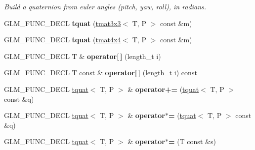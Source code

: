 \begin{DoxyCompactItemize}
\begin{DoxyCompactList}\small\item\em Build a quaternion from euler angles (pitch, yaw, roll), in radians. \end{DoxyCompactList}\item 
G\+L\+M\+\_\+\+F\+U\+N\+C\+\_\+\+D\+E\+CL {\bfseries tquat} (\hyperlink{structglm_1_1detail_1_1tmat3x3}{tmat3x3}$<$ T, P $>$ const \&m)\hypertarget{structglm_1_1detail_1_1tquat_a84d40b0f5ab95f1e5ce01596c909fa25}{}\label{structglm_1_1detail_1_1tquat_a84d40b0f5ab95f1e5ce01596c909fa25}

\item 
G\+L\+M\+\_\+\+F\+U\+N\+C\+\_\+\+D\+E\+CL {\bfseries tquat} (\hyperlink{structglm_1_1detail_1_1tmat4x4}{tmat4x4}$<$ T, P $>$ const \&m)\hypertarget{structglm_1_1detail_1_1tquat_ad880a08dccbc297944a24204640c516d}{}\label{structglm_1_1detail_1_1tquat_ad880a08dccbc297944a24204640c516d}

\item 
G\+L\+M\+\_\+\+F\+U\+N\+C\+\_\+\+D\+E\+CL T \& {\bfseries operator\mbox{[}$\,$\mbox{]}} (length\+\_\+t i)\hypertarget{structglm_1_1detail_1_1tquat_ad4f23768ca2296f8e0f140a5f03cd404}{}\label{structglm_1_1detail_1_1tquat_ad4f23768ca2296f8e0f140a5f03cd404}

\item 
G\+L\+M\+\_\+\+F\+U\+N\+C\+\_\+\+D\+E\+CL T const \& {\bfseries operator\mbox{[}$\,$\mbox{]}} (length\+\_\+t i) const \hypertarget{structglm_1_1detail_1_1tquat_aa5925e3eb8482a6c64881bfa6ca5e259}{}\label{structglm_1_1detail_1_1tquat_aa5925e3eb8482a6c64881bfa6ca5e259}

\item 
G\+L\+M\+\_\+\+F\+U\+N\+C\+\_\+\+D\+E\+CL \hyperlink{structglm_1_1detail_1_1tquat}{tquat}$<$ T, P $>$ \& {\bfseries operator+=} (\hyperlink{structglm_1_1detail_1_1tquat}{tquat}$<$ T, P $>$ const \&q)\hypertarget{structglm_1_1detail_1_1tquat_af711fbfb41fee281c93d990afa15f01e}{}\label{structglm_1_1detail_1_1tquat_af711fbfb41fee281c93d990afa15f01e}

\item 
G\+L\+M\+\_\+\+F\+U\+N\+C\+\_\+\+D\+E\+CL \hyperlink{structglm_1_1detail_1_1tquat}{tquat}$<$ T, P $>$ \& {\bfseries operator$\ast$=} (\hyperlink{structglm_1_1detail_1_1tquat}{tquat}$<$ T, P $>$ const \&q)\hypertarget{structglm_1_1detail_1_1tquat_a243cc89ef80ff3d0a9fd85fc3038587e}{}\label{structglm_1_1detail_1_1tquat_a243cc89ef80ff3d0a9fd85fc3038587e}

\item 
G\+L\+M\+\_\+\+F\+U\+N\+C\+\_\+\+D\+E\+CL \hyperlink{structglm_1_1detail_1_1tquat}{tquat}$<$ T, P $>$ \& {\bfseries operator$\ast$=} (T const \&s)\hypertarget{structglm_1_1detail_1_1tquat_a65a23d874bc35ecade85c50bf5425a90}{}\label{structglm_1_1detail_1_1tquat_a65a23d874bc35ecade85c50bf5425a90}


\end{DoxyCompactItemize}
